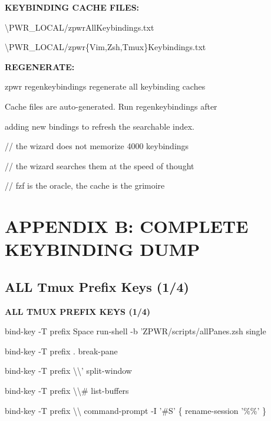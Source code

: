 \documentclass[11pt,a4paper,twoside]{book}
\begin{document}
\vspace{12pt}
{\bfseries\color{neonyellow} KEYBINDING CACHE FILES:}\vspace{4pt}

\textbackslash{}PWR\_LOCAL/zpwrAllKeybindings.txt

\textbackslash{}PWR\_LOCAL/zpwr\{Vim,Zsh,Tmux\}Keybindings.txt


\vspace{12pt}
{\bfseries\color{neonyellow} REGENERATE:}\vspace{4pt}

\begin{codebox}
zpwr regenkeybindings  regenerate all keybinding caches\\
\end{codebox}

Cache files are auto-generated. Run regenkeybindings after

adding new bindings to refresh the searchable index.

// the wizard does not memorize 4000 keybindings

// the wizard searches them at the speed of thought

// fzf is the oracle, the cache is the grimoire


\vspace{16pt}


\chapter{APPENDIX B: COMPLETE KEYBINDING DUMP}

\section{ALL Tmux Prefix Keys (1/4)}


\vspace{10pt}
{\large\bfseries\color{neoncyan} ALL TMUX PREFIX KEYS (1/4)}\vspace{6pt}

bind-key  -T prefix  Space  run-shell -b 'ZPWR/scripts/allPanes.zsh single

bind-key  -T prefix  .  break-pane

bind-key  -T prefix  \textbackslash{}\textbackslash{}'  split-window

bind-key  -T prefix  \textbackslash{}\textbackslash{}\#  list-buffers

bind-key  -T prefix  \textbackslash{}\textbackslash{}  command-prompt -I '\#S' \{ rename-session '\%\%' \}
\end{document}
